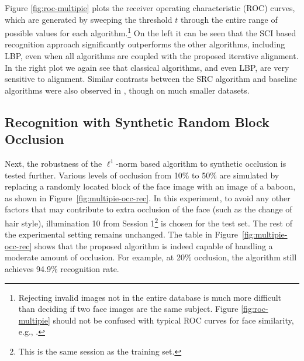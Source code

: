 Figure \ref{fig:roc-multipie} plots the receiver operating characteristic (ROC)
curves, which are generated by sweeping the threshold $t$ through the entire
range of possible values for each algorithm.\footnote{Rejecting invalid images
not in the entire database is much more difficult than deciding if two face
images are the same subject. Figure \ref{fig:roc-multipie} should not be
confused with typical ROC curves for face similarity, e.g.,
\cite{PhillipsP2007}.} On the left it can be seen that the SCI based
recognition approach significantly outperforms the other algorithms, including
LBP, even when all algorithms are coupled with the proposed iterative
alignment.  In the right plot we again see that classical algorithms, and even
LBP, are very sensitive to alignment.  Similar contrasts between the SRC
algorithm and baseline algorithms were also observed in \cite{Wright2009-PAMI},
though on much smaller datasets.

\subsection{Recognition with Synthetic Random Block Occlusion}

Next, the robustness of the $\ell^1$-norm based
algorithm to synthetic occlusion is tested further. 
Various levels of
occlusion from 10\% to 50\% are simulated by replacing a randomly located
block of the face image with an image of a baboon, as shown in
Figure~\ref{fig:multipie-occ-rec}. In this experiment, to avoid
any other factors that may contribute to extra occlusion of the
face (such as the change of hair style), illumination
10 from Session 1\footnote{This is the same session as the
training set.} is chosen for the test set. The rest of the experimental setting
remains unchanged. The table in
Figure~\ref{fig:multipie-occ-rec} shows that the proposed algorithm is
indeed capable of handling a moderate amount of occlusion. For
example, at 20\% occlusion, the algorithm still achieves 94.9\%
recognition rate.

